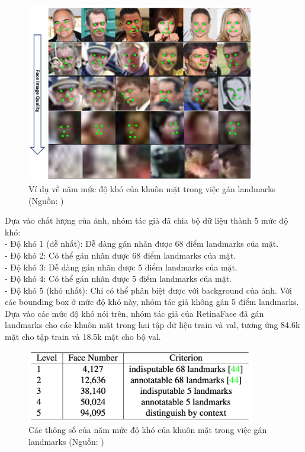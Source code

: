 {    \begin{figure}[H]
        \centering
        \includegraphics[width=10cm] {images/widerface_five_levels_lm_1}
        \caption{Ví dụ về năm mức độ khó của khuôn mặt trong việc gán landmarks (Nguồn: \cite{deng2020retinaface})}
        \label{fig:widerface_five_levels_lm_1}
    \end{figure}

    \noindent
    Dựa vào chất lượng của ảnh, nhóm tác giả đã chia bộ dữ liệu thành 5 mức độ khó: \\
    - Độ khó 1 (dễ nhất): Dễ dàng gán nhãn được 68 điểm landmarks của mặt. \\
    - Độ khó 2: Có thể gán nhãn được 68 điểm landmarks của mặt. \\
    - Độ khó 3: Dễ dàng gán nhãn được 5 điểm landmarks của mặt. \\
    - Độ khó 4: Có thể gán nhãn được 5 điểm landmarks của mặt. \\
    - Độ khó 5 (khó nhất): Chỉ có thể phân biệt được với background  của ảnh. Với các bounding box  ở mức độ khó này, nhóm tác giả không gán 5 điểm landmarks. \\
    Dựa vào các mức độ khó nói trên, nhóm tác giả của RetinaFace đã gán landmarks cho các khuôn mặt trong hai tập dữ liệu train và val, tương ứng 84.6k mặt cho tập train và 18.5k mặt cho bộ val.

    \begin{figure}[H]
        \centering
        \includegraphics[width=10cm] {images/widerface_five_levels_lm_2}
        \caption{Các thông số của năm mức độ khó của khuôn mặt trong việc gán landmarks (Nguồn: \cite{deng2020retinaface})}
        \label{fig:widerface_five_levels_lm_2}
    \end{figure}

}
